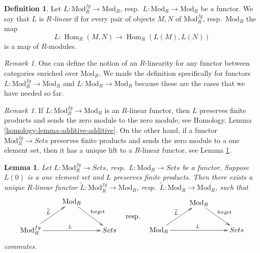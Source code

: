 \documentclass{stacks-project}
\theoremstyle{plain}
\newtheorem{lemma}[subsection]{Lemma}
\theoremstyle{definition}
\newtheorem{definition}[subsection]{Definition}
\theoremstyle{remark}
\newtheorem{remark}[subsection]{Remark}
\numberwithin{equation}{subsection}
\def\Hom{\mathop{\mathrm{Hom}}\nolimits}
\begin{document}
\begin{definition}
\label{definition-linear}
Let $L: \text{Mod}^{fg}_R \to \text{Mod}_R$,
resp.\ $L: \text{Mod}_R \to \text{Mod}_R$
be a functor.  We say that $L$ is {\it $R$-linear} if for every
pair of objects $M, N$ of $\text{Mod}^{fg}_R$, resp.\ $\text{Mod}_R$
the map
$$
L : \Hom_R(M, N) \longrightarrow \Hom_R(L(M), L(N))
$$
is a map of $R$-modules.
\end{definition}

\begin{remark}
\label{remark-linear-enriched-over-modules}
One can define the notion of an $R$-linearity for any functor between
categories enriched over $\text{Mod}_R$. We made the definition
specifically for functors $L: \text{Mod}^{fg}_R \to \text{Mod}_R$ and
$L: \text{Mod}_R \to \text{Mod}_R$
because these are the cases that we have needed so far.
\end{remark}

\begin{remark}
\label{remark-linear-functor}
If $L: \text{Mod}^{fg}_R \to \text{Mod}_R$ is an $R$-linear functor,
then $L$ preserves finite products and sends the zero module to the zero
module, see
Homology, Lemma \ref{homology-lemma-additive-additive}.
On the other hand, if a functor $\text{Mod}^{fg}_R \to \textit{Sets}$
preserves finite products and sends the zero module to a one element set,
then it has a unique lift to a $R$-linear functor, see
Lemma \ref{lemma-linear-functor}.
\end{remark}

\begin{lemma}
\label{lemma-linear-functor}
Let $L: \text{Mod}^{fg}_R \to \textit{Sets}$,
resp.\ $L: \text{Mod}_R \to \textit{Sets}$ be a
functor.  Suppose $L(0)$ is a one element set and $L$ preserves finite
products.  Then there exists a unique $R$-linear functor
$\widetilde{L} : \text{Mod}^{fg}_R \to \text{Mod}_R$,
resp.\  $\widetilde{L} : \text{Mod}_R \to \text{Mod}_R$,
such that
$$
\vcenter{
\xymatrix{
& \text{Mod}_R \ar[dr]^{\text{forget}} &   \\
\text{Mod}^{fg}_R  \ar[ur]^{\widetilde{L}} \ar[rr]^{L} &  &
\textit{Sets}
}
}
\quad\text{resp.}\quad
\vcenter{
\xymatrix{
& \text{Mod}_R \ar[dr]^{\text{forget}} &   \\
\text{Mod}_R  \ar[ur]^{\widetilde{L}} \ar[rr]^{L} &  &
\textit{Sets}
}
}
$$
commutes.
\end{lemma}
\end{document}
